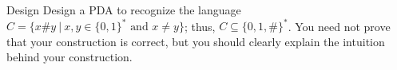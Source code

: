 \documentclass{article}
\begin{document}
\begin{problem}{Design}
Design a PDA to recognize the language $C = \{x\# y\: |\: x,y \in
\{0,1\}^* \mbox{ and } x \neq y\}$; thus, $C \subseteq
\{0,1,\#\}^*$. You need not prove that your construction is correct, but
you should clearly explain the intuition behind your
construction.
\end{problem}
\end{document}
